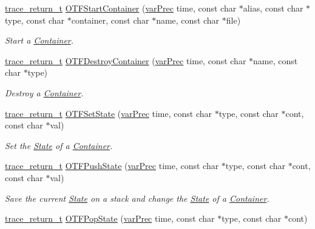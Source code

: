 \begin{DoxyCompactItemize}
\hyperlink{group__type_ga1f1b68fb37d7331f03a48ef0993a0788}{trace\-\_\-return\-\_\-t} \hyperlink{group__cotf_gafd43ca39c5ad8a5d88325480ff9fca75}{O\-T\-F\-Start\-Container} (\hyperlink{group__type_gabda13d5bcd0cbdb094d655181a857e25}{var\-Prec} time, const char $\ast$alias, const char $\ast$type, const char $\ast$container, const char $\ast$name, const char $\ast$file)
\begin{DoxyCompactList}\small\item\em Start a \hyperlink{structContainer}{Container}. \end{DoxyCompactList}\item 
\hyperlink{group__type_ga1f1b68fb37d7331f03a48ef0993a0788}{trace\-\_\-return\-\_\-t} \hyperlink{group__cotf_gaa83d4e4210ed18a25f697fff36f43b84}{O\-T\-F\-Destroy\-Container} (\hyperlink{group__type_gabda13d5bcd0cbdb094d655181a857e25}{var\-Prec} time, const char $\ast$name, const char $\ast$type)
\begin{DoxyCompactList}\small\item\em Destroy a \hyperlink{structContainer}{Container}. \end{DoxyCompactList}\item 
\hyperlink{group__type_ga1f1b68fb37d7331f03a48ef0993a0788}{trace\-\_\-return\-\_\-t} \hyperlink{group__cotf_ga8535ccc5a1ec7d512eef43a5588ec6db}{O\-T\-F\-Set\-State} (\hyperlink{group__type_gabda13d5bcd0cbdb094d655181a857e25}{var\-Prec} time, const char $\ast$type, const char $\ast$cont, const char $\ast$val)
\begin{DoxyCompactList}\small\item\em Set the \hyperlink{structState}{State} of a \hyperlink{structContainer}{Container}. \end{DoxyCompactList}\item 
\hyperlink{group__type_ga1f1b68fb37d7331f03a48ef0993a0788}{trace\-\_\-return\-\_\-t} \hyperlink{group__cotf_gafcaf513ad403f1073a60292ee797422c}{O\-T\-F\-Push\-State} (\hyperlink{group__type_gabda13d5bcd0cbdb094d655181a857e25}{var\-Prec} time, const char $\ast$type, const char $\ast$cont, const char $\ast$val)
\begin{DoxyCompactList}\small\item\em Save the current \hyperlink{structState}{State} on a stack and change the \hyperlink{structState}{State} of a \hyperlink{structContainer}{Container}. \end{DoxyCompactList}\item 
\hyperlink{group__type_ga1f1b68fb37d7331f03a48ef0993a0788}{trace\-\_\-return\-\_\-t} \hyperlink{group__cotf_ga91c6066968d7c788dcd88c264a93636b}{O\-T\-F\-Pop\-State} (\hyperlink{group__type_gabda13d5bcd0cbdb094d655181a857e25}{var\-Prec} time, const char $\ast$type, const char $\ast$cont)

\end{DoxyCompactItemize}
